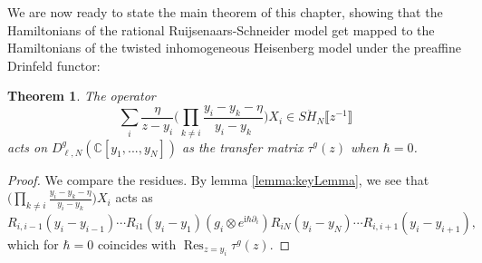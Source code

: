 \documentclass[11pt]{report}
\newtheorem{theorem}{Theorem}[section]
\theoremstyle{definition}
\theoremstyle{remark}
\theoremstyle{remark}
\newcommand{\C}{\mathbb{C}}
\newcommand{\I}{\mathrm{i}}
\begin{document}
We are now ready to state the main theorem of this chapter, showing that the Hamiltonians of the rational Ruijsenaars-Schneider model get mapped to the Hamiltonians of the twisted inhomogeneous Heisenberg model under the preaffine Drinfeld functor:

\begin{theorem}
The operator
\begin{equation*}
\sum_i \frac{\eta}{z-y_i} \bigg( \prod_{k \neq i} \frac{y_i-y_k-\eta}{y_i-y_k} \bigg) X_i \in S\ddot H_N\llbracket z^{-1} \rrbracket
\end{equation*}
acts on $D_{\ell,N}^g(\C[y_1,...,y_N])$ as the transfer matrix $\tau^g(z)$ when $\hbar = 0$.
\end{theorem}

\begin{proof}
We compare the residues. By lemma \ref{lemma:keyLemma}, we see that $\bigg( \prod_{k \neq i} \frac{y_i-y_k-\eta}{y_i-y_k} \bigg) X_i$ acts as
\begin{equation*}
R_{i,i-1}(y_i-y_{i-1}) \cdots R_{i1}(y_i-y_1) (g_i \otimes e^{\I \hbar \partial_i}) R_{iN}(y_i-y_N) \cdots R_{i,i+1}(y_i-y_{i+1}),
\end{equation*}
which for $\hbar = 0$ coincides with $\operatorname{Res}_{z=y_i} \tau^g(z)$.
\end{proof}
\end{document}
